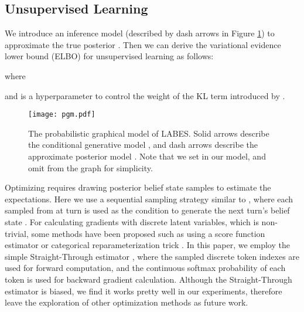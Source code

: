 \documentclass[11pt,a4paper]{article}
\newcommand{\modelname}{LABES}
\begin{document}
	\subsection*{Unsupervised Learning}
	We introduce an inference model  (described by dash arrows in Figure \ref{pgm}) to approximate the true posterior . Then we can derive the variational evidence lower bound (ELBO) for unsupervised learning as follows:
	
	where 
	
	and  is a hyperparameter to control the weight of the KL term introduced by \citet{higgins2017beta}. 
	
	\begin{figure}[t]
		\centering
		\texttt{[image: pgm.pdf]}
		\caption{The probabilistic graphical model of \modelname{}. Solid arrows describe the conditional generative model , and dash arrows describe the approximate posterior model . Note that we set  in our model, and omit  from the graph for simplicity.  }
		\label{pgm}
\end{figure}
	
	Optimizing  requires drawing posterior belief state samples  to estimate the expectations. Here we use a sequential sampling strategy similar to \citet{kim2020sequential}, where each  sampled from  at turn  is used as the condition to generate the next turn's belief state . For calculating gradients with discrete latent variables, which is non-trivial, some methods have been proposed such as using a score function estimator \cite{williams1992simple} or categorical reparameterization trick \cite{jang2016categorical}. In this paper, we employ the simple Straight-Through estimator \cite{bengio2013estimating}, where the sampled discrete token indexes are used for forward computation, and the continuous softmax probability of each token is used for backward gradient calculation. Although the Straight-Through estimator is biased, we find it works pretty well in our experiments, therefore leave the exploration of other optimization methods as future work. 
	
	\begin{figure*}[t]
		\centering
		\subfigure[Overview of \modelname{-S2S}.]
		{	\label{all}
			\texttt{[image: model.pdf]} }
\caption{ (a) shows the computational graph of \modelname{-S2S}. In (b), rectangles in different colors denote different word embeddings, and the embedding of domain names and slot names are concatenated as the initial input. Note that the same (i.e. weight-tied) decoder is shared across all slots. Decoding stops when a slot-specific end-of-sentence symbol is generated, which is possible to be the first output if the slot does not appear in the dialog. }
\label{model}
	\end{figure*}
	
\end{document}
